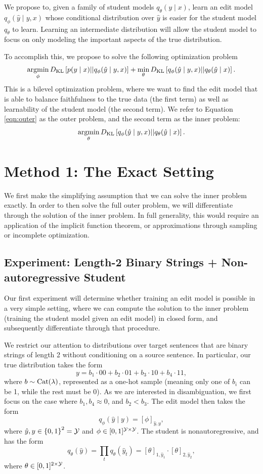 \documentclass[11pt]{article}
\begin{document}
We propose to, given a family of student models $q_\theta(y \mid x)$,
learn an edit model $q_\phi(\hat{y} \mid y, x)$ whose conditional distribution over $\hat{y}$
is easier for the student model $q_\theta$ to learn.
Learning an intermediate distribution will allow the student model to focus on only modeling
the important aspects of the true distribution.

To accomplish this, we propose to solve the following optimization problem
\begin{equation}
    \label{eqn:outer}
    \operatorname*{argmin}_\phi D_\mathrm{KL}\left[p(y \mid x) || q_\phi(\hat{y} \mid y, x)\right]
    + \min_\theta D_\mathrm{KL}\left[q_\phi(\hat{y} \mid y, x) || q_\theta(\hat{y} \mid x)\right].
\end{equation}
This is a bilevel optimization problem, where we want to find the edit model
that is able to balance faithfulness to the true data (the first term)
as well as learnability of the student model (the second term).
We refer to Equation \ref{eqn:outer} as the outer problem,
and the second term as the inner problem:
\begin{equation}
    \label{eqn:inner}
    \operatorname*{argmin}_\theta D_\mathrm{KL}\left[q_\phi(\hat{y} \mid y, x) || q_\theta(\hat{y} \mid x)\right].
\end{equation}

\section{Method 1: The Exact Setting}
We first make the simplifying assumption that we can solve the inner problem exactly.
In order to then solve the full outer problem, we will differentiate through the solution of the
inner problem.
In full generality, this would require an application of the implicit function theorem,
or approximations through sampling or incomplete optimization.

\subsection{Experiment: Length-2 Binary Strings + Non-autoregressive Student}
Our first experiment will determine whether training an edit model is possible in a
very simple setting, where we can compute the solution to the inner problem
(training the student model given an edit model) in closed form,
and subsequently differentiate through that procedure.

We restrict our attention to distributions over target sentences that are
binary strings of length 2 without conditioning on a source sentence.
In particular, our true distribution takes the form
$$y = b_1\cdot 00 + b_2\cdot 01 + b_3\cdot 10 + b_4\cdot 11,$$
where $b\sim\mathrm{Cat}(\lambda)$, represented as a one-hot sample
(meaning only one of $b_i$ can be 1, while the rest must be 0).
As we are interested in disambiguation, we first focus on the case where
$b_1, b_4 \approx 0$, and $b_2 < b_3$.
The edit model then takes the form
$$q_\phi(\hat{y} \mid y)= [\phi]_{\hat{y},y},$$
where $\hat{y},y \in \left\{0,1\right\}^2 = \mathcal{Y}$ and $\phi \in [0,1]^{\mathcal{Y}\times\mathcal{Y}}$.
The student is nonautoregressive, and has the form
$$q_\theta(\hat{y}) = \prod_t q_\theta(\hat{y}_t)
= [\theta]_{1,\hat{y}_1} \cdot [\theta]_{2,\hat{y}_2},$$
where $\theta\in[0,1]^{2\times\mathcal{Y}}$.
\end{document}
